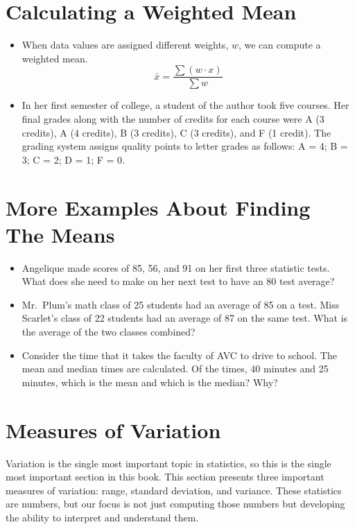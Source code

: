 \documentclass[]{book}
\providecommand{\tightlist}{%
  \setlength{\itemsep}{0pt}\setlength{\parskip}{0pt}}
\begin{document}
\hypertarget{calculating-a-weighted-mean}{%
\section{Calculating a Weighted Mean}\label{calculating-a-weighted-mean}}

\begin{itemize}
\tightlist
\item
  When data values are assigned different weights, \(w\), we can compute a weighted mean.
  \[\bar{x}=\frac{\sum{(w\cdot x)}}{\sum{w}}\]
\item
  In her first semester of college, a student of the author took five courses.
  Her final grades along with the number of credits for each course were A (3 credits), A (4 credits), B (3 credits), C (3 credits), and F (1 credit).
  The grading system assigns quality points to letter grades as follows:
  A = 4; B = 3; C = 2; D = 1; F = 0.
\end{itemize}

\hypertarget{more-examples-about-finding-the-means}{%
\section{More Examples About Finding The Means}\label{more-examples-about-finding-the-means}}

\begin{itemize}
\tightlist
\item
  Angelique made scores of 85, 56, and 91 on her first three statistic tests. What does she need to make on her next test to have an 80 test average?
\item
  Mr.~Plum's math class of 25 students had an average of 85 on a test. Miss Scarlet's class of 22 students had an average of 87 on the same test. What is the average of the two classes combined?
\item
  Consider the time that it takes the faculty of AVC to drive to school. The mean and median times are calculated. Of the times, 40 minutes and 25 minutes, which is the mean and which is the median? Why?
\end{itemize}

\hypertarget{measures-of-variation}{%
\section{Measures of Variation}\label{measures-of-variation}}

Variation is the single most important topic in statistics, so this is the single most important section in this book. This section presents three important measures of variation: range, standard deviation, and variance.
These statistics are numbers, but our focus is not just computing those numbers but developing the ability to interpret and understand them.
\end{document}

